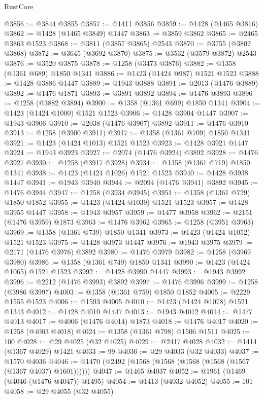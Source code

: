 \begin{lexlean}{RustCore}
\begin{coremodule}
@3856 := @3844 @3855
@3857 := @1411 @3856
@3859 := @1428 (@1465 @3816)
@3862 := @1428 (@1465 @3849) @1447
@3863 := @3859 @3862
@3865 := @2465 @3863 @1523
@3868 := @3811 (@3857 @3865) @2543
@3870 := @3755 (@3802 @3868)
@3872 := @3645 (@3692 @3870)
@3875 := @3532 (@3579 @3872) @2543
@3876 := @3520 @3875
@3878 := @1258 (@3473 @3876)
@3882 := @1358 (@1361 @689) @1850 @1341
@3886 := @1423 (@1424 @987) @1521 @1523
@3888 := @1428 @3886 @1447
@3889 := @1943 @3888
@3891 := @2013 (@1476 @3889)
@3892 := @1476 @1871
@3893 := @3891 @3892
@3894 := @1476 @3893
@3896 := @1258 (@3882 @3894)
@3900 := @1358 (@1361 @699) @1850 @1341
@3904 := @1423 (@1424 @1000) @1521 @1523
@3906 := @1428 @3904 @1447
@3907 := @1943 @3906
@3910 := @2038 (@1476 @3907) @3892
@3911 := @1476 @3910
@3913 := @1258 (@3900 @3911)
@3917 := @1358 (@1361 @709) @1850 @1341
@3921 := @1423 (@1424 @1013) @1521 @1523
@3923 := @1428 @3921 @1447
@3924 := @1943 @3923
@3927 := @2074 (@1476 @3924) @3892
@3928 := @1476 @3927
@3930 := @1258 (@3917 @3928)
@3934 := @1358 (@1361 @719) @1850 @1341
@3938 := @1423 (@1424 @1026) @1521 @1523
@3940 := @1428 @3938 @1447
@3941 := @1943 @3940
@3944 := @2094 (@1476 @3941) @3892
@3945 := @1476 @3944
@3947 := @1258 (@3934 @3945)
@3951 := @1358 (@1361 @729) @1850 @1852
@3955 := @1423 (@1424 @1039) @1521 @1523
@3957 := @1428 @3955 @1447
@3958 := @1943 @3957
@3959 := @1477 @3958
@3962 := @2151 (@1476 @3959) @1873
@3963 := @1476 @3962
@3965 := @1258 (@3951 @3963)
@3969 := @1358 (@1361 @739) @1850 @1341
@3973 := @1423 (@1424 @1052) @1521 @1523
@3975 := @1428 @3973 @1447
@3976 := @1943 @3975
@3979 := @2171 (@1476 @3976) @3892
@3980 := @1476 @3979
@3982 := @1258 (@3969 @3980)
@3986 := @1358 (@1361 @749) @1850 @1341
@3990 := @1423 (@1424 @1065) @1521 @1523
@3992 := @1428 @3990 @1447
@3993 := @1943 @3992
@3996 := @2212 (@1476 @3993) @3892
@3997 := @1476 @3996
@3999 := @1258 (@3986 @3997)
@4003 := @1358 (@1361 @759) @1850 @1852
@4005 := @2229 @1555 @1523
@4006 := @1593 @4005
@4010 := @1423 (@1424 @1078) @1521 @1343
@4012 := @1428 @4010 @1447
@4013 := @1943 @4012
@4014 := @1477 @4013
@4017 := @4006 (@1476 @4014) @1873
@4018 := @1476 @4017
@4020 := @1258 (@4003 @4018)
@4024 := @1358 (@1361 @798) @1506 @1511
@4025 := 100
@4028 := @29 @4025 (@32 @4025)
@4029 := @2417 @4028
@4032 := @1414 (@1367 @4029) @1421
@4033 := 99
@4036 := @29 @4033 (@32 @4033)
@4037 := @1570 @4036
@4046 := @1470 (@2492 (@1568 (@1568 (@1568 (@1568 (@1567 (@1367 @4037) @1601))))))
@4047 := @1465 @4037
@4052 := @1961 (@1469 (@4046 (@1476 @4047)) @1495)
@4054 := @1413 (@4032 @4052)
@4055 := 101
@4058 := @29 @4055 (@32 @4055)

\end{coremodule}
\end{lexlean}
